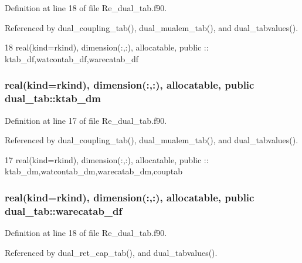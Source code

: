 Definition at line 18 of file Re\+\_\+dual\+\_\+tab.\+f90.



Referenced by dual\+\_\+coupling\+\_\+tab(), dual\+\_\+mualem\+\_\+tab(), and dual\+\_\+tabvalues().


\begin{DoxyCode}
18   \textcolor{keywordtype}{real(kind=rkind)}, \textcolor{keywordtype}{dimension(:,:)}, \textcolor{keywordtype}{allocatable}, \textcolor{keywordtype}{public} :: ktab\_df,watcontab\_df,warecatab\_df
\end{DoxyCode}
\subsubsection[{ktab\+\_\+dm}]{\setlength{\rightskip}{0pt plus 5cm}real(kind=rkind), dimension(\+:,\+:), allocatable, public dual\+\_\+tab\+::ktab\+\_\+dm}\label{namespacedual__tab_aa07602c537fa03fd8a91e830394f416a}


Definition at line 17 of file Re\+\_\+dual\+\_\+tab.\+f90.



Referenced by dual\+\_\+coupling\+\_\+tab(), dual\+\_\+mualem\+\_\+tab(), and dual\+\_\+tabvalues().


\begin{DoxyCode}
17   \textcolor{keywordtype}{real(kind=rkind)}, \textcolor{keywordtype}{dimension(:,:)}, \textcolor{keywordtype}{allocatable}, \textcolor{keywordtype}{public} :: ktab\_dm,watcontab\_dm,warecatab\_dm,couptab
\end{DoxyCode}
\subsubsection[{warecatab\+\_\+df}]{\setlength{\rightskip}{0pt plus 5cm}real(kind=rkind), dimension(\+:,\+:), allocatable, public dual\+\_\+tab\+::warecatab\+\_\+df}\label{namespacedual__tab_aa1dda6698faf68c50532b69a9179d724}


Definition at line 18 of file Re\+\_\+dual\+\_\+tab.\+f90.



Referenced by dual\+\_\+ret\+\_\+cap\+\_\+tab(), and dual\+\_\+tabvalues().

